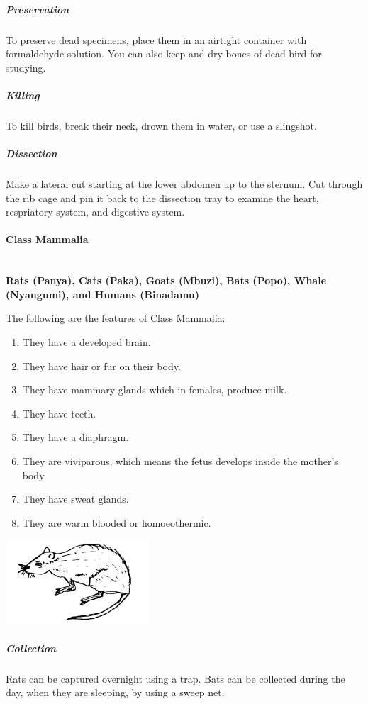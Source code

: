 \begin{multicols}{2}
\subparagraph{Preservation} 
To preserve dead specimens, place them in an airtight container with formaldehyde solution. You can also keep and dry bones of dead bird for studying.

\subparagraph{Killing}
 To kill birds, break their neck, drown them in water, or use a slingshot.

\subparagraph{Dissection}
Make a lateral cut starting at the lower abdomen up to the sternum. Cut through the rib cage and pin it back to the dissection tray to examine the heart, respriatory system, and digestive system.

\paragraph{Class Mammalia}\hfill \\
\textbf{Rats (Panya), Cats (Paka), Goats (Mbuzi), Bats (Popo), Whale (Nyangumi), and Humans (Binadamu)}

The following are the features of Class Mammalia:
\begin{enumerate}
\item{They have a developed brain.}
\item{They have hair or fur on their body.}
\item{They have mammary glands which in females, produce milk.}
\item{They have teeth.}
\item{They have a diaphragm.}
\item{They are viviparous, which means the fetus develops inside the mother’s body.}
\item{They have sweat glands.}
\item{They are warm blooded or homoeothermic.}
\end{enumerate}

\columnbreak

\begin{center}
\includegraphics[width=0.4\textwidth]{./img/rat.png}
\end{center}

\subparagraph{Collection}
Rats can be captured overnight using a trap. Bats can be collected during the day, when they are sleeping, by using a sweep net.


\end{multicols}
